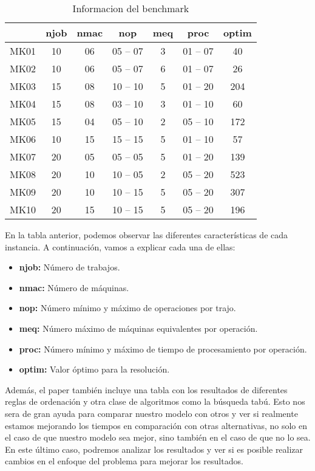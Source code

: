 \begin{table}[ht]
    \centering
    \begin{tabular}[ht]{c|ccccc|c} 
                  & njob & nmac & nop & meq & proc & optim \\
        \hline 
        MK01      & 10  & 06    & 05 -- 07  & 3  & 01 -- 07  & 40\\
        MK02      & 10  & 06    & 05 -- 07  & 6  & 01 -- 07  & 26\\
        MK03      & 15  & 08    & 10 -- 10  & 5  & 01 -- 20  & 204\\
        MK04      & 15  & 08    & 03 -- 10  & 3  & 01 -- 10  & 60\\
        MK05      & 15  & 04    & 05 -- 10  & 2  & 05 -- 10  & 172\\
        MK06      & 10  & 15    & 15 -- 15  & 5  & 01 -- 10  & 57\\
        MK07      & 20  & 05    & 05 -- 05  & 5  & 01 -- 20  & 139\\
        MK08      & 20  & 10    & 10 -- 05  & 2  & 05 -- 20  & 523\\
        MK09      & 20  & 10    & 10 -- 15  & 5  & 05 -- 20  & 307\\
        MK10      & 20  & 15    & 10 -- 15  & 5  & 05 -- 20  & 196\\
    \end{tabular}
    \caption{Informacion del benchmark}
\end{table}

En la tabla anterior, podemos observar las diferentes características de cada instancia. A continuación,
vamos a explicar cada una de ellas:
\begin{itemize}
    \item \textbf{njob:} Número de trabajos.
    \item \textbf{nmac:} Número de máquinas.
    \item \textbf{nop:} Número mínimo y máximo de operaciones por trajo.
    \item \textbf{meq:} Número máximo de máquinas equivalentes por operación.
    \item \textbf{proc:} Número mínimo y máximo de tiempo de procesamiento por operación.
    \item \textbf{optim:} Valor óptimo para la resolución.
\end{itemize} 

Además, el paper \cite*{pbrandimarte} también incluye una tabla con los resultados de diferentes
reglas de ordenación y otra clase de algoritmos como la búsqueda tabú. Esto nos sera de gran ayuda
para comparar nuestro modelo con otros y ver si realmente estamos mejorando los tiempos en
comparación con otras alternativas, no solo en el caso de que nuestro modelo sea mejor, sino también
en el caso de que no lo sea. En este último caso, podremos analizar los resultados y ver si es posible
realizar cambios en el enfoque del problema para mejorar los resultados.
